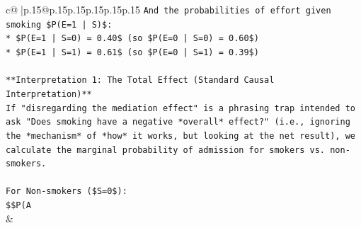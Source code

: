 \documentclass{article}
\begin{document}
{\begin{supertabular}{c@{$\;$}|p{.15\linewidth}@{}p{.15\linewidth}p{.15\linewidth}p{.15\linewidth}p{.15\linewidth}p{.15\linewidth}}
{{{\texttt{And the probabilities of effort given smoking \$P(E=1 | S)\$:} \\
\texttt{*   \$P(E=1 | S=0) = 0.40\$ (so \$P(E=0 | S=0) = 0.60\$)} \\
\texttt{*   \$P(E=1 | S=1) = 0.61\$ (so \$P(E=0 | S=1) = 0.39\$)} \\
\\ 
\texttt{**Interpretation 1: The Total Effect (Standard Causal Interpretation)**} \\
\texttt{If "disregarding the mediation effect" is a phrasing trap intended to ask "Does smoking have a negative *overall* effect?" (i.e., ignoring the *mechanism* of *how* it works, but looking at the net result), we calculate the marginal probability of admission for smokers vs. non{-}smokers.} \\
\\ 
\texttt{For Non{-}smokers (\$S=0\$):} \\
\texttt{\$\$P(A} \\
            }
        }
    }
    & \\ \\


\end{supertabular}}
\end{document}
